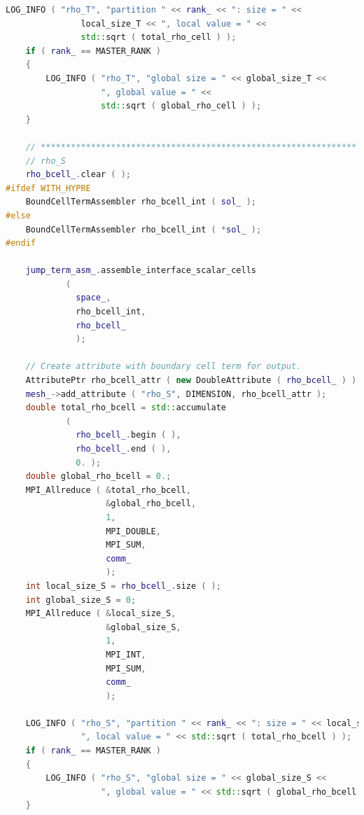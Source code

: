 \documentclass[a4paper, 11pt, twoside]{article}
\begin{document}
\begin{lstlisting}[language=C++, basicstyle={\footnotesize, \ttfamily}, keywordstyle=\color{blue}, numbers=none, tabsize=4]
    LOG_INFO ( "rho_T", "partition " << rank_ << ": size = " << 
               local_size_T << ", local value = " << 
               std::sqrt ( total_rho_cell ) );
    if ( rank_ == MASTER_RANK )
    {
        LOG_INFO ( "rho_T", "global size = " << global_size_T << 
                   ", global value = " << 
                   std::sqrt ( global_rho_cell ) );
    }

    // ***************************************************************
    // rho_S
    rho_bcell_.clear ( );
#ifdef WITH_HYPRE
    BoundCellTermAssembler rho_bcell_int ( sol_ );
#else
    BoundCellTermAssembler rho_bcell_int ( *sol_ );
#endif

    jump_term_asm_.assemble_interface_scalar_cells
            (
              space_,
              rho_bcell_int,
              rho_bcell_
              );

    // Create attribute with boundary cell term for output.
    AttributePtr rho_bcell_attr ( new DoubleAttribute ( rho_bcell_ ) );
    mesh_->add_attribute ( "rho_S", DIMENSION, rho_bcell_attr );
    double total_rho_bcell = std::accumulate
            (
              rho_bcell_.begin ( ),
              rho_bcell_.end ( ),
              0. );
    double global_rho_bcell = 0.;
    MPI_Allreduce ( &total_rho_bcell,
                    &global_rho_bcell,
                    1,
                    MPI_DOUBLE,
                    MPI_SUM,
                    comm_
                    );
    int local_size_S = rho_bcell_.size ( );
    int global_size_S = 0;
    MPI_Allreduce ( &local_size_S,
                    &global_size_S,
                    1,
                    MPI_INT,
                    MPI_SUM,
                    comm_
                    );

    LOG_INFO ( "rho_S", "partition " << rank_ << ": size = " << local_size_S << 
               ", local value = " << std::sqrt ( total_rho_bcell ) );
    if ( rank_ == MASTER_RANK )
    {
        LOG_INFO ( "rho_S", "global size = " << global_size_S << 
                   ", global value = " << std::sqrt ( global_rho_bcell ) );
    }


\end{lstlisting}
\end{document}
